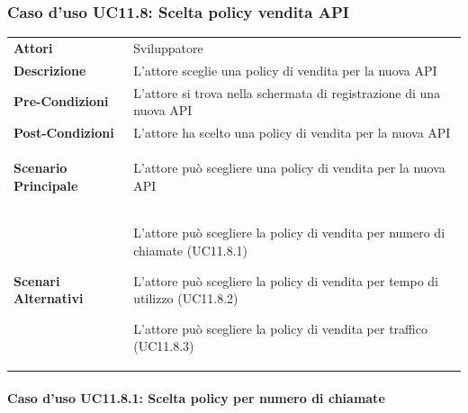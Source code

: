 \subsubsection{Caso d'uso UC11.8: Scelta policy vendita API}
\label{UC9_2}

\begin{minipage}{\linewidth}
	\begin{tabular}{ l | p{11cm}}
		\hline
		\rowcolor{Gray}
		\multicolumn{2}{c}{UC11.8.2 - Scelta policy vendita API} \\
		\hline
		\textbf{Attori} & Sviluppatore \\
		\textbf{Descrizione} & L'attore sceglie una policy di vendita per la nuova API \\
		\textbf{Pre-Condizioni} & L'attore si trova nella schermata di registrazione di una nuova API \\
		\textbf{Post-Condizioni} & L'attore ha scelto una policy di vendita per la nuova API \\
		\textbf{Scenario Principale} & 
		\begin{enumerate*}[label=(\arabic*.),itemjoin={\newline}]
			\item L'attore può scegliere una policy di vendita per la nuova API
		\end{enumerate*}\\
		\textbf{Scenari Alternativi} & 
		\begin{enumerate*}[label=(\arabic*.),itemjoin={\newline}]
			\item L'attore può scegliere la policy di vendita per numero di chiamate (UC11.8.1)
			\item L'attore può scegliere la policy di vendita per tempo di utilizzo (UC11.8.2)
			\item L'attore può scegliere la policy di vendita per traffico (UC11.8.3)	
		\end{enumerate*}\\
	\end{tabular}
\end{minipage}

\paragraph{Caso d'uso UC11.8.1: Scelta policy per numero di chiamate}
\label{UC11_8_1}

